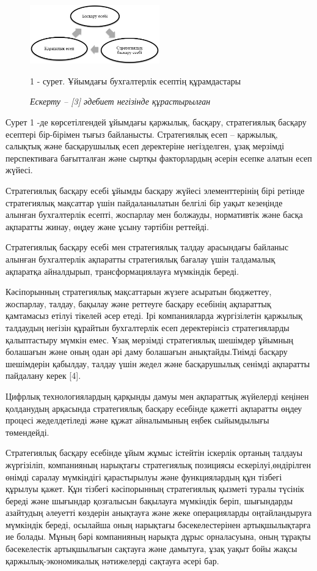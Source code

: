 \begin{figure}[H]
	\centering
	\includegraphics[width=0.5\textwidth]{media/ekon4/image20}
	\caption*{1 - сурет. Ұйымдағы бухгалтерлік есептің құрамдастары}
	\caption*{\normalfont\emph{Ескерту -- {[}3{]} әдебиет негізінде құрастырылған}}
\end{figure}

\begin{multicols}{2}
Сурет 1 -де көрсетілгендей ұйымдағы қаржылық, басқару, стратегиялық
басқару есептері бір-бірімен тығыз байланысты. Стратегиялық есеп --
қаржылық, салықтық және басқарушылық есеп деректеріне негізделген, ұзақ
мерзімді перспективаға бағытталған және сыртқы факторлардың әсерін
есепке алатын есеп жүйесі.

Стратегиялық басқару есебі ұйымды басқару жүйесі элементтерінің бірі
ретінде стратегиялық мақсаттар үшін пайдаланылатын белгілі бір уақыт
кезеңінде алынған бухгалтерлік есепті, жоспарлау мен болжауды,
нормативтік және басқа ақпаратты жинау, өңдеу және ұсыну тәртібін
реттейді.

Стратегиялық басқару есебі мен стратегиялық талдау арасындағы байланыс
алынған бухгалтерлік ақпаратты стратегиялық бағалау үшін талдамалық
ақпаратқа айналдырып, трансформациялауға мүмкіндік береді.

Кәсіпорынның стратегиялық мақсаттарын жүзеге асыратын бюджеттеу,
жоспарлау, талдау, бақылау және реттеуге басқару есебінің ақпараттық
қамтамасыз етілуі тікелей әсер етеді. Ірі компанияларда жүргізілетін
қаржылық талдаудың негізін құрайтын бухгалтерлік есеп деректерінсіз
стратегияларды қалыптастыру мүмкін емес. Ұзақ мерзімді стратегиялық
шешімдер ұйымның болашағын және оның одан әрі даму болашағын
анықтайды.Тиімді басқару шешімдерін қабылдау, талдау үшін жедел және
басқарушылық сенімді ақпаратты пайдалану керек {[}4{]}.

Цифрлық технологиялардың қарқынды дамуы мен ақпараттық жүйелерді кеңінен
қолданудың арқасында стратегиялық басқару есебінде қажетті ақпаратты
өңдеу процесі жеделдетіледі және құжат айналымының еңбек сыйымдылығы
төмендейді.

Стратегиялық басқару есебінде ұйым жұмыс істейтін іскерлік ортаның
талдауы жүргізіліп, компанияның нарықтағы стратегиялық позициясы
ескерілуі,өндірілген өнімді саралау мүмкіндігі қарастырылуы және
функциялардың құн тізбегі құрылуы қажет. Құн тізбегі кәсіпорынның
стратегиялық қызметі туралы түсінік береді және шығындар қозғалысын
бақылауға мүмкіндік беріп, шығындарды азайтудың әлеуетті көздерін
анықтауға және жеке операцияларды оңтайландыруға мүмкіндік береді,
осылайша оның нарықтағы бәсекелестерінен артықшылықтарға ие болады.
Мұның бәрі компанияның нарықта дұрыс орналасуына, оның тұрақты
бәсекелестік артықшылығын сақтауға және дамытуға, ұзақ уақыт бойы жақсы
қаржылық-экономикалық нәтижелерді сақтауға әсері бар.


\end{multicols}
